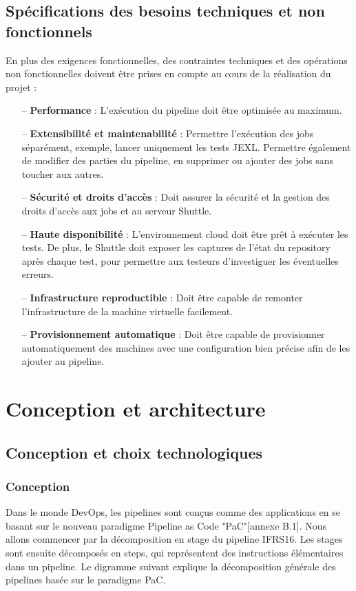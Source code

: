 \begin{spacing}{1.2}
\subsection{Spécifications des besoins techniques et non fonctionnels}
En plus des exigences fonctionnelles, des contraintes techniques et des opérations non fonctionnelles doivent être prises en compte au cours de la réalisation du projet :
\begin{itemize}
\setlength\itemsep{0em}
\item[--] \textbf{Performance} : L'exécution du pipeline doit être optimisée au maximum.
\item[--] \textbf{Extensibilité et maintenabilité} : Permettre l'exécution des jobs séparément, exemple, lancer uniquement les tests JEXL. Permettre également de modifier des parties du pipeline, en supprimer ou ajouter des jobs sans toucher aux autres. 
\item[--] \textbf{Sécurité et droits d’accès} : Doit assurer la sécurité et la gestion des droits d’accès aux jobs et au serveur Shuttle.
\item[--] \textbf{Haute disponibilité} : L'environnement cloud doit être prêt à exécuter les tests. De plus, le Shuttle doit exposer les captures de l'état du repository après chaque test, pour permettre aux testeurs d'investiguer les éventuelles erreurs.
\item[--] \textbf{Infrastructure reproductible} : Doit être capable de remonter l'infrastructure de la machine virtuelle facilement. 
\item[--] \textbf{Provisionnement automatique} : Doit être capable de provisionner automatiquement des machines avec une configuration bien précise afin de les ajouter au pipeline. 
\end{itemize}

\section{Conception et architecture}
\subsection{Conception et choix technologiques}
\subsubsection{Conception}
Dans le monde DevOps, les pipelines sont conçus comme des applications en se basant sur le nouveau paradigme Pipeline as Code "PaC"[annexe B.1]. Nous allons commencer par la décomposition en stage du pipeline IFRS16.
Les stages sont ensuite décomposés en steps, qui représentent des instructions élémentaires dans un pipeline. Le digramme suivant explique la décomposition générale des pipelines basée sur le paradigme PaC.


\end{spacing}
